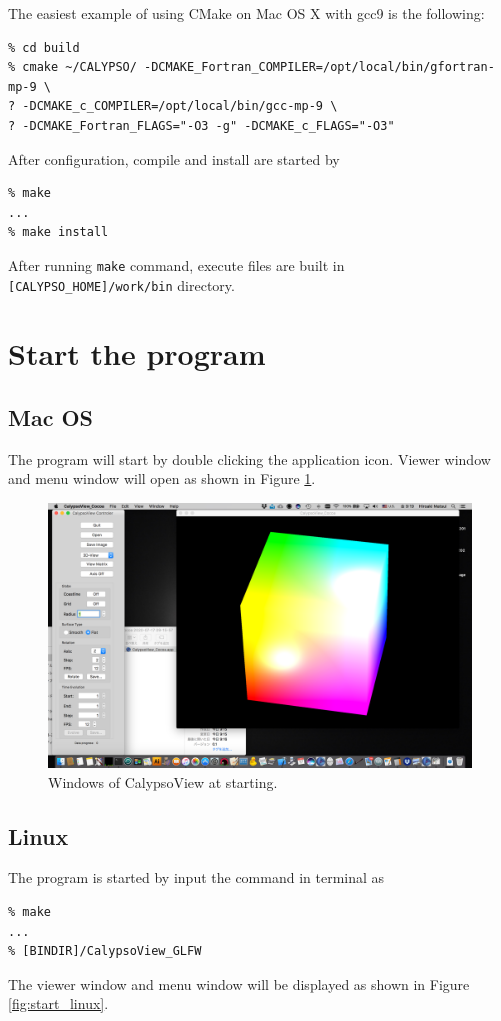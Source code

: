 %
The easiest example of using CMake on Mac OS X with gcc9 is the following:
\begin{verbatim}
% cd build
% cmake ~/CALYPSO/ -DCMAKE_Fortran_COMPILER=/opt/local/bin/gfortran-mp-9 \
? -DCMAKE_c_COMPILER=/opt/local/bin/gcc-mp-9 \
? -DCMAKE_Fortran_FLAGS="-O3 -g" -DCMAKE_c_FLAGS="-O3"
\end{verbatim}
%
After configuration, compile and install are started by
\begin{verbatim}
% make
...
% make install
\end{verbatim}
%

After running \verb|make| command, execute files are built in \verb|[CALYPSO_HOME]/work/bin| directory.

\section{Start the program}
\subsection{Mac OS}
The program will start by double clicking the application icon. Viewer window and menu window will open as shown in Figure \ref{fig:start_mac}.
%
\begin{figure}[htbp]
\begin{center}
\includegraphics*[width=120mm]{Images/Desktop_101}
\end{center}
\caption{Windows of CalypsoView at starting.}
\label{fig:start_mac}
\end{figure}
%

\subsection{Linux}
The program is started by input the command in terminal as 
\begin{verbatim}
% make
...
% [BINDIR]/CalypsoView_GLFW
\end{verbatim}
%
The viewer window and menu window will be displayed as shown in Figure \ref{fig:start_linux}.

